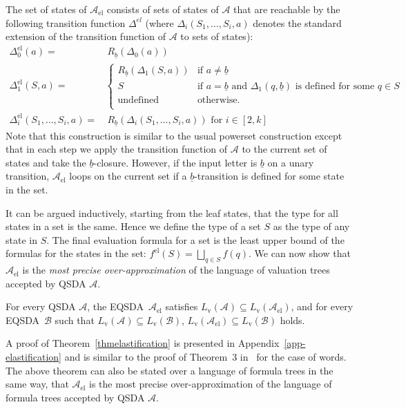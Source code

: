 \documentclass{llncs}
\newcommand{\A}{\mathcal{A}}
\newcommand{\B}{\mathcal{B}}
\newcommand{\AEL}{\A_\text{el}}
\newcommand{\blank}{\underline{b}}
\newcommand{\Lval}{L_{\text{v}}}
\newcommand{\EQSDA}{\mbox{\sc EQSDA}}
\begin{document}
The set of states of $\AEL$ consists of sets of states of $\A$
that
are reachable by the following transition function $\Delta^{el}$ (where $\Delta_i(S_1, \ldots, S_i,a)$ denotes the
standard extension of the transition function of $\A$ to sets of
states):
{\footnotesize
\begin{align}
\Delta_0^{\text{el}}(a) =& ~R_{\blank}(\Delta_0(a)) \nonumber \\
\Delta_1^{\text{el}}(S, a) =&
\begin{cases}
R_{\blank}(\Delta_1(S,a)) & \mbox{if } a \not= \blank \\
S  & \mbox{if } a = \blank \mbox{ and $\Delta_1(q,\blank)$ is defined  for some $q \in S$} \\
\mbox{undefined}  & \mbox{otherwise.} \\
\end{cases} \nonumber \\
\Delta_i^{\text{el}}(S_1, \ldots, S_i, a) =& ~R_{\blank}(\Delta_i(S_1, \ldots, S_i, a )) \mbox{ for } i \in [2, k] \nonumber
\end{align}
}
\noindent Note that this construction is similar to the usual powerset construction
except that in each step we apply the transition function of $\A$ to the
current set of states and take the $\blank$-closure. However, if the
input letter is $\blank$ on a unary transition, $\AEL$ loops on the current
set if a $\blank$-transition is defined for some state in the set.

It can be argued inductively, starting from the leaf states, that the type for all states in a set is the same. Hence we define the type of a set $S$ as the type of any state in $S$.
The final evaluation formula for a set is the least upper bound of the
formulas for the states in the set:
$f^{\text{el}}(S) = \bigsqcup_{q \in S}f(q)$.
We can now show that $\AEL$  is the
\emph{most precise over-approximation} of the language of valuation trees accepted by QSDA $\A$.

\begin{theorem}\label{thmelastification}
For every QSDA $\A$, the \EQSDA\ $\AEL$ satisfies
$\Lval(\A) \subseteq \Lval(\AEL)$, and
for every \EQSDA\ $\B$ such that $\Lval(\A) \subseteq \Lval(\B)$, $\Lval(\AEL) \subseteq \Lval(\B)$ holds.
\end{theorem}

A proof of Theorem~\ref{thmelastification} is presented in Appendix~\ref{app-elastification} and is similar to the proof of Theorem~3 in~\cite{CAVQDA} for the case of words.
The above theorem can also be stated over a language of formula trees in the same way, that $\AEL$ is the most precise
over-approximation of the language of formula trees accepted by QSDA $\A$.
\end{document}
